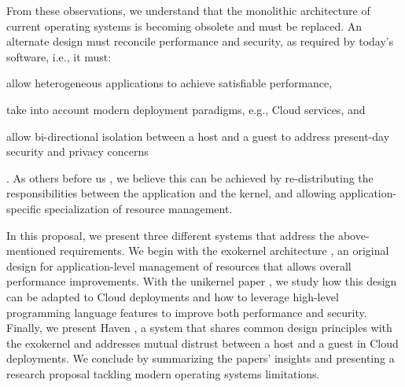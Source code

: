 From these observations, we understand that the monolithic architecture of current operating systems is becoming obsolete and must be replaced.
An alternate design must reconcile performance and security, as required by today's software, i.e., it must:
\begin{enumerate*}
	\item allow heterogeneous applications to achieve satisfiable performance,
	\item take into account modern deployment paradigms, e.g., Cloud services, and 
	\item allow bi-directional isolation between a host and a guest to address present-day security and privacy concerns
\end{enumerate*}.
As others before us \cite{DBLP:conf/sosp/EnglerKO95,DBLP:conf/hotos/EnglerK95,DBLP:conf/sosp/KaashoekEGBHMPGM97,DBLP:journals/tocs/CaoFKL96,DBLP:journals/sigops/HartyC92}, we believe this can be achieved by re-distributing the responsibilities between the application and the kernel, and allowing application-specific specialization of resource management.

In this proposal, we present three different systems that address the above-mentioned requirements.
We begin with the exokernel architecture \cite{DBLP:conf/sosp/EnglerKO95}, an original design for application-level management of resources that allows overall performance improvements.
With the unikernel paper \cite{DBLP:conf/asplos/MadhavapeddyMRSSGSHC13}, we study how this design can be adapted to Cloud deployments and how to leverage high-level programming language features to improve both performance and security.
Finally, we present Haven \cite{DBLP:journals/tocs/BaumannPH15}, a system that shares common design principles with the exokernel and addresses mutual distrust between a host and a guest in Cloud deployments.
We conclude by summarizing the papers' insights and presenting a research proposal tackling modern operating systems limitations.







